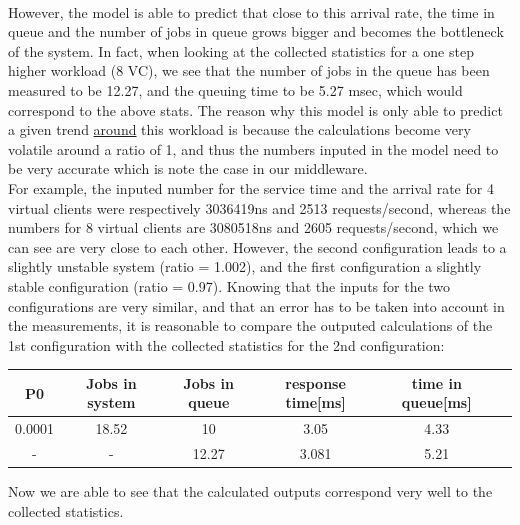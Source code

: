 \documentclass[11pt,a4paper]{article}
\begin{document}
\\However, the model is able to predict that close to this arrival rate, the time in queue and the number of jobs in queue grows bigger and becomes the bottleneck of the system. In fact, when looking at the collected statistics for a one step higher workload (8 VC), we see that the number of jobs in the queue has been measured to be 12.27, and the queuing time to be 5.27 msec, which would correspond to the above stats. The reason why this model is only able to predict a given trend \underline{around} this workload is because the calculations become very volatile around a ratio of 1, and thus the numbers inputed in the model need to be very accurate which is note the case in our middleware. 
\\
For example, the inputed number for the service time and the arrival rate for 4 virtual clients were respectively 3036419ns and 2513 requests/second, whereas the numbers for 8 virtual clients are 3080518ns and 2605 requests/second, which we can see are very close to each other. However, the second configuration leads to a slightly unstable system (ratio = 1.002), and the first configuration a slightly stable configuration (ratio = 0.97). Knowing that the inputs for the two configurations are very similar, and that an error has to be taken into account in the measurements, it is reasonable to compare the outputed calculations of the 1st configuration with the collected statistics for the 2nd configuration:
 \begin{center}

		\begin{tabular}{|c|c|c|c|c|c|}
			  \hline
			  \textbf{P0} & \textbf{Jobs in system} & \textbf{Jobs in queue} & \textbf{response time[ms]} & \textbf{time in queue[ms]}\\
			  \hline
			  0.0001  & 18.52 & 10 & 3.05 & 4.33 \\
			  - & - & 12.27  & 3.081 & 5.21 \\
			  \hline
		\end{tabular}
 \end{center}
Now we are able to see that the calculated outputs correspond very well to the collected statistics.
\\\\
\end{document}

